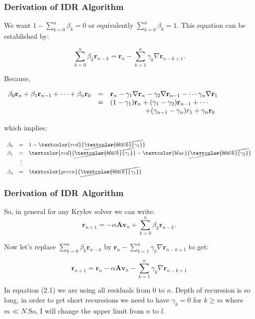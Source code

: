 \documentclass[mathserif]{beamer}
\begin{document}
\begin{frame}
\frametitle{Derivation of IDR Algorithm}
We want $1- \sum_{k=0}^n \beta_k=0$ or equivalently $ \sum_{k=0}^n \beta_k=1$. This equation can be established by:

\[\sum_{k=0}^n\beta_k \mathbf{r}_{n-k}=\mathbf{r}_n -\sum_{k=1}^n \gamma_k \nabla \mathbf{r}_{n-k+1}.\]

\pause
Because,

$\begin{array} {lclclcl}  \beta_0\mathbf{r}_n+\beta_1 \mathbf{r}_{n-1}+ \cdots +\beta_n\mathbf{r}_0 &=& \mathbf{r}_n-\gamma_1\nabla \mathbf{r}_n -\gamma_2 \nabla \mathbf{r}_{n-1} - \cdots \gamma_n\nabla \mathbf{r}_1 \\&=& (1-\gamma_1)\mathbf{r}_n+(\gamma_1-\gamma_2)\mathbf{r}_{n-1}+\cdots \\&& \hspace{.7in}+(\gamma_{n-1}-\gamma_n)r_1+\gamma_n\mathbf{r}_0  \end{array}$

\pause
which implies:

$\begin{array} {lclclcl}  
\beta_0&=&1-\textcolor{red}{\cancel{\textcolor{black}{\gamma_1}}}\\
\beta_1&=&\textcolor{red}{\cancel{\textcolor{black}{\gamma_1}}}-\textcolor{blue}{\cancel{\textcolor{black}{\gamma_2}}}\\
&\vdots&\\
\beta_n &=& \textcolor{green}{\cancel{\textcolor{black}{\gamma_1}}}
\end{array}$

\end{frame}

\begin{frame}
\frametitle{Derivation of IDR Algorithm}
So, in general for any Krylov solver we can write:
\[\mathbf{r}_{n+1}=-\alpha \mathbf{A}\mathbf{v}_n+\sum\limits_{k=0}^{n} \beta_k \mathbf{r}_{n-k}. \]

\pause
Now let's replace $\sum\limits_{k=0}^{n} \beta_k \mathbf{r}_{n-k} $ by $\mathbf{r}_n -\sum_{k=1}^n \gamma_k \nabla \mathbf{r}_{n-k+1}$ to get:

\begin{equation}\tag{2.1} \mathbf{r}_{n+1} =\mathbf{r}_n-\alpha \mathbf{A} \mathbf{v}_n-\sum \limits_ {k=1}^n \gamma_k \nabla \mathbf{r}_{n-k+1} \end{equation}

\pause
In equation (2.1) we are using all residuals from $0$ to $n$. Depth of recurssion is so long, in order to get short recurssions we need to have $\gamma_k=0$ for $k \ge m$ where $m \ll N$.\pause  So, I will change the upper limit from $n$ to $l$.
\end{frame}
\end{document}
